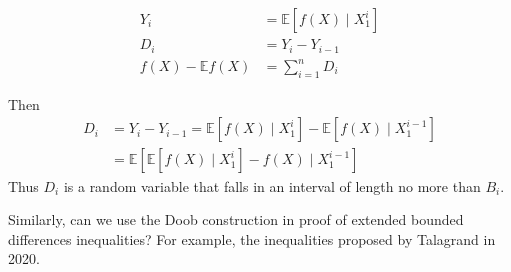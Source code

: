 \begin{equation}
    \begin{aligned}
    Y_{i} &=\mathbb{E}\left[f(X) \mid X_{1}^{i}\right] \\
    D_{i} &=Y_{i}-Y_{i-1} \\
    f(X)-\mathbb{E} f(X) &=\sum_{i=1}^{n} D_{i}
    \end{aligned}
\end{equation}
  
Then
\begin{equation}
    \begin{aligned}
    D_{i} &=Y_{i}-Y_{i-1}=\mathbb{E}\left[f(X) \mid X_{1}^{i}\right]-\mathbb{E}\left[f(X) \mid X_{1}^{i-1}\right] \\
    &=\mathbb{E}\left[\mathbb{E}\left[f(X) \mid X_{1}^{i}\right]-f(X) \mid X_{1}^{i-1}\right]
    \end{aligned}
\end{equation}
Thus $D_i$ is a random variable that falls in an interval of length no more than $B_i$.

Similarly, can we use the Doob construction in proof of extended bounded differences inequalities? 
For example, the inequalities proposed by Talagrand in 2020.